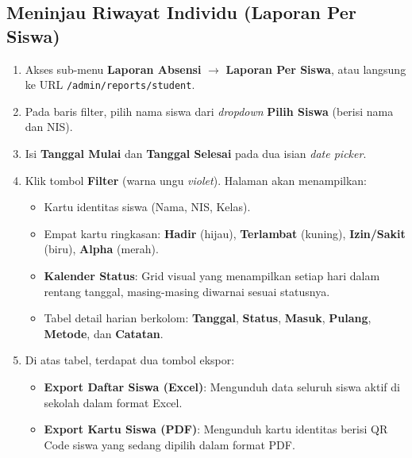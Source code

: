\subsection{Meninjau Riwayat Individu (Laporan Per Siswa)}
\begin{enumerate}
    \item Akses sub-menu \textbf{Laporan Absensi} $\rightarrow$ \textbf{Laporan Per Siswa}, atau langsung ke URL \texttt{/admin/reports/student}.
    \item Pada baris filter, pilih nama siswa dari \textit{dropdown} \textbf{Pilih Siswa} (berisi nama dan NIS).
    \item Isi \textbf{Tanggal Mulai} dan \textbf{Tanggal Selesai} pada dua isian \textit{date picker}.
    \item Klik tombol \textbf{Filter} (warna ungu \textit{violet}). Halaman akan menampilkan:
    \begin{itemize}
        \item Kartu identitas siswa (Nama, NIS, Kelas).
        \item Empat kartu ringkasan: \textbf{Hadir} (hijau), \textbf{Terlambat} (kuning), \textbf{Izin/Sakit} (biru), \textbf{Alpha} (merah).
        \item \textbf{Kalender Status}: Grid visual yang menampilkan setiap hari dalam rentang tanggal, masing-masing diwarnai sesuai statusnya.
        \item Tabel detail harian berkolom: \textbf{Tanggal}, \textbf{Status}, \textbf{Masuk}, \textbf{Pulang}, \textbf{Metode}, dan \textbf{Catatan}.
    \end{itemize}
    \item Di atas tabel, terdapat dua tombol ekspor:
    \begin{itemize}
        \item \textbf{Export Daftar Siswa (Excel)}: Mengunduh data seluruh siswa aktif di sekolah dalam format Excel.
        \item \textbf{Export Kartu Siswa (PDF)}: Mengunduh kartu identitas berisi QR Code siswa yang sedang dipilih dalam format PDF.
    \end{itemize}
\end{enumerate}

